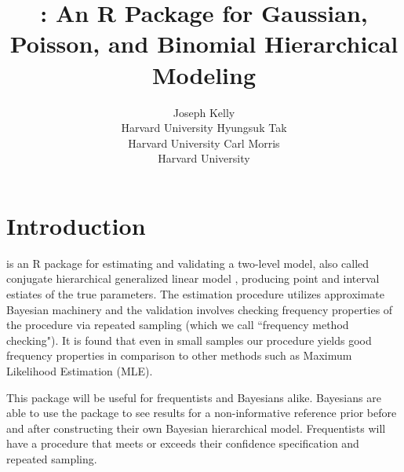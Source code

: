 \documentclass[article]{jss}
\author{Joseph Kelly\\Harvard University \And 
             Hyungsuk Tak\\Harvard University\And
             Carl Morris\\ Harvard University}
\title{\pkg{Rgbp}: An R Package for Gaussian, Poisson, and Binomial Hierarchical Modeling}
\begin{document}

\section[introduction]{Introduction}
 is an R package for estimating and validating a two-level model, also called conjugate hierarchical generalized linear model \citep{hglm2006, hglm2010}, producing point and interval estiates of the true parameters. The estimation procedure utilizes approximate Bayesian machinery and the validation involves checking frequency properties of the procedure via repeated sampling (which we call ``frequency method checking"). It is found that even in small samples our procedure yields good frequency properties in comparison to other methods such as Maximum Likelihood Estimation (MLE). 

This package will be useful for frequentists and Bayesians alike. Bayesians are able to use the package to see results for a non-informative reference prior before and after constructing their own Bayesian hierarchical model. Frequentists will have a procedure that meets or exceeds their confidence specification and repeated sampling.



\end{document}
